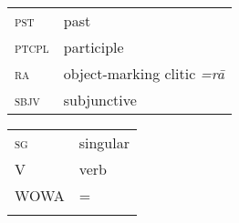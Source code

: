 \documentclass[output=paper,colorlinks,citecolor=brown,draftmode]{langscibook}
\begin{document}
\begin{tabularx}{.45\textwidth}{@{}lQ@{}}
\textsc{pst} & past \\
\textsc{ptcpl} & participle \\
\textsc{ra} & object-marking {clitic} \textit{=rā}\\
\textsc{sbjv} & subjunctive \\
\end{tabularx}
\begin{tabularx}{.45\textwidth}{@{}lQ@{}}
\textsc{sg} & singular \\
V & {verb} \\
WOWA & = \citet{Haig.Stilo.Dogan.Schiborr2022} \\
\\
\end{tabularx}

\sloppy
\printbibliography[heading=subbibliography,notkeyword=this]
\end{document}
